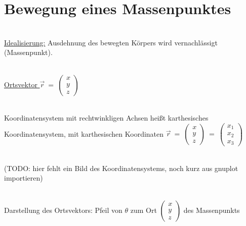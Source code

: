 


\section{Bewegung eines Massenpunktes}

\begin{flushleft}

~\\ 


\underline{Idealisierung:} Ausdehnung des bewegten Körpers wird vernachlässigt (Massenpunkt).

~\\

\underline{Ortsvektor $\vec{r} ~ = ~ \left(\begin{array}{c}x\\ y\\ z\end{array}\right)$}

~\\


Koordinatensystem mit rechtwinkligen Achsen heißt karthesisches Koordinatensystem, mit karthesischen Koordinaten $\vec{r} ~ = ~ \left(\begin{array}{c}x\\ y\\ z\end{array}\right) ~ = ~ \left(\begin{array}{c}x_1\\ x_2\\ x_3\end{array}\right)$

\iec

~\\

(TODO: hier fehlt ein Bild des Koordinatensystems, noch kurz aus gnuplot importieren)

~\\

Darstellung des Ortsvektors: Pfeil von $\theta$ zum Ort $\left(\begin{array}{c}x\\ y\\ z\end{array}\right)$ des Massenpunkts

~\\


\end{flushleft}
